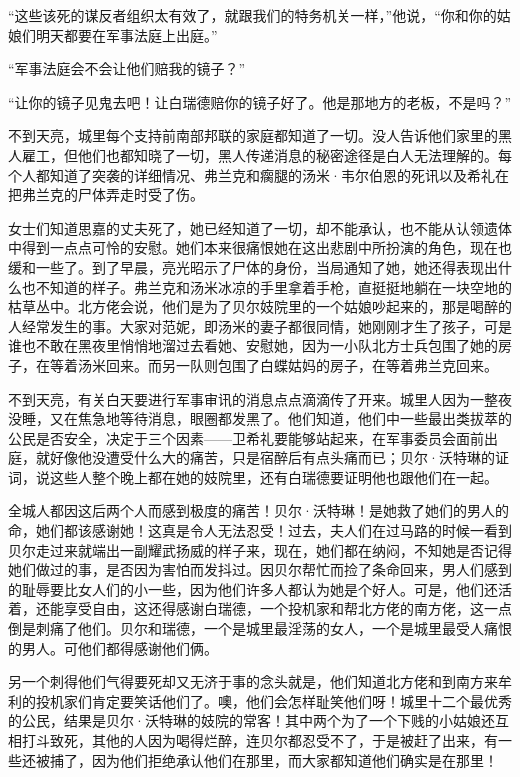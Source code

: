 \par “这些该死的谋反者组织太有效了，就跟我们的特务机关一样，”他说，“你和你的姑娘们明天都要在军事法庭上出庭。”
\par “军事法庭会不会让他们赔我的镜子？”
\par “让你的镜子见鬼去吧！让白瑞德赔你的镜子好了。他是那地方的老板，不是吗？”
\par 不到天亮，城里每个支持前南部邦联的家庭都知道了一切。没人告诉他们家里的黑人雇工，但他们也都知晓了一切，黑人传递消息的秘密途径是白人无法理解的。每个人都知道了突袭的详细情况、弗兰克和瘸腿的汤米·韦尔伯恩的死讯以及希礼在把弗兰克的尸体弄走时受了伤。
\par 女士们知道思嘉的丈夫死了，她已经知道了一切，却不能承认，也不能从认领遗体中得到一点点可怜的安慰。她们本来很痛恨她在这出悲剧中所扮演的角色，现在也缓和一些了。到了早晨，亮光昭示了尸体的身份，当局通知了她，她还得表现出什么也不知道的样子。弗兰克和汤米冰凉的手里拿着手枪，直挺挺地躺在一块空地的枯草丛中。北方佬会说，他们是为了贝尔妓院里的一个姑娘吵起来的，那是喝醉的人经常发生的事。大家对范妮，即汤米的妻子都很同情，她刚刚才生了孩子，可是谁也不敢在黑夜里悄悄地溜过去看她、安慰她，因为一小队北方士兵包围了她的房子，在等着汤米回来。而另一队则包围了白蝶姑妈的房子，在等着弗兰克回来。
\par 不到天亮，有关白天要进行军事审讯的消息点点滴滴传了开来。城里人因为一整夜没睡，又在焦急地等待消息，眼圈都发黑了。他们知道，他们中一些最出类拔萃的公民是否安全，决定于三个因素——卫希礼要能够站起来，在军事委员会面前出庭，就好像他没遭受什么大的痛苦，只是宿醉后有点头痛而已；贝尔·沃特琳的证词，说这些人整个晚上都在她的妓院里，还有白瑞德要证明他也跟他们在一起。
\par 全城人都因这后两个人而感到极度的痛苦！贝尔·沃特琳！是她救了她们的男人的命，她们都该感谢她！这真是令人无法忍受！过去，夫人们在过马路的时候一看到贝尔走过来就端出一副耀武扬威的样子来，现在，她们都在纳闷，不知她是否记得她们做过的事，是否因为害怕而发抖过。因贝尔帮忙而捡了条命回来，男人们感到的耻辱要比女人们的小一些，因为他们许多人都认为她是个好人。可是，他们还活着，还能享受自由，这还得感谢白瑞德，一个投机家和帮北方佬的南方佬，这一点倒是刺痛了他们。贝尔和瑞德，一个是城里最淫荡的女人，一个是城里最受人痛恨的男人。可他们都得感谢他们俩。
\par 另一个刺得他们气得要死却又无济于事的念头就是，他们知道北方佬和到南方来牟利的投机家们肯定要笑话他们了。噢，他们会怎样耻笑他们呀！城里十二个最优秀的公民，结果是贝尔·沃特琳的妓院的常客！其中两个为了一个下贱的小姑娘还互相打斗致死，其他的人因为喝得烂醉，连贝尔都忍受不了，于是被赶了出来，有一些还被捕了，因为他们拒绝承认他们在那里，而大家都知道他们确实是在那里！

